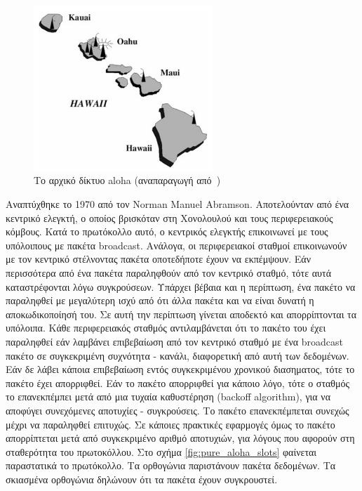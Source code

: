 \documentclass[12pt]{report}
\begin{document}
\begin{figure}[ht]
\centering
\includegraphics[width=0.6\textwidth]{hawaii}
\caption{Το αρχικό δίκτυο \textlatin{aloha} (αναπαραγωγή από~\cite{book:01})}
\label{fig:hawaii}
\end{figure}

Αναπτύχθηκε το 1970 από τον \textlatin{Norman Manuel Abramson}. Αποτελούνταν από ένα κεντρικό ελεγκτή, ο οποίος βρισκόταν στη Χονολουλού και τους περιφερειακούς κόμβους. Κατά το πρωτόκολλο αυτό, ο κεντρικός ελεγκτής επικοινωνεί με τους υπόλοιπους με πακέτα \textlatin{broadcast}. Ανάλογα, οι περιφερειακοί σταθμοί επικοινωνούν με τον κεντρικό στέλνοντας πακέτα οποτεδήποτε έχουν να εκπέμψουν. Εάν περισσότερα από ένα πακέτα παραληφθούν από τον κεντρικό σταθμό, τότε αυτά καταστρέφονται λόγω συγκρούσεων. Υπάρχει βέβαια και η περίπτωση, ένα πακέτο να παραληφθεί με μεγαλύτερη ισχύ από ότι άλλα πακέτα και να είναι δυνατή η αποκωδικοποίησή του. Σε αυτή την περίπτωση γίνεται αποδεκτό και απορρίπτονται τα υπόλοιπα. Κάθε περιφερειακός σταθμός αντιλαμβάνεται ότι το πακέτο του έχει παραληφθεί εάν λαμβάνει επιβεβαίωση από τον κεντρικό σταθμό με ένα \textlatin{broadcast} πακέτο σε συγκεκριμένη συχνότητα - κανάλι, διαφορετική από αυτή των δεδομένων. Εάν δε λάβει κάποια επιβεβαίωση εντός συγκεκριμένου χρονικού διασηματος, τότε το πακέτο έχει απορριφθεί. Εάν το πακέτο απορριφθεί για κάποιο λόγο, τότε ο σταθμός το επανεκπέμπει μετά από μια τυχαία καθυστέρηση (\textlatin{backoff algorithm}), για να αποφύγει συνεχόμενες αποτυχίες - συγκρούσεις. Το πακέτο επανεκπέμπεται συνεχώς μέχρι να παραληφθεί επιτυχώς. Σε κάποιες πρακτικές εφαρμογές όμως το πακέτο απορρίπτεται μετά από συγκεκριμένο αριθμό αποτυχιών, για λόγους που αφορούν στη σταθερότητα του πρωτοκόλλου. Στο σχήμα \ref{fig:pure_aloha_slots} φαίνεται παραστατικά το πρωτόκολλο. Τα ορθογώνια παριστάνουν πακέτα δεδομένων. Τα σκιασμένα ορθογώνια δηλώνουν ότι τα πακέτα έχουν συγκρουστεί.
\end{document}
